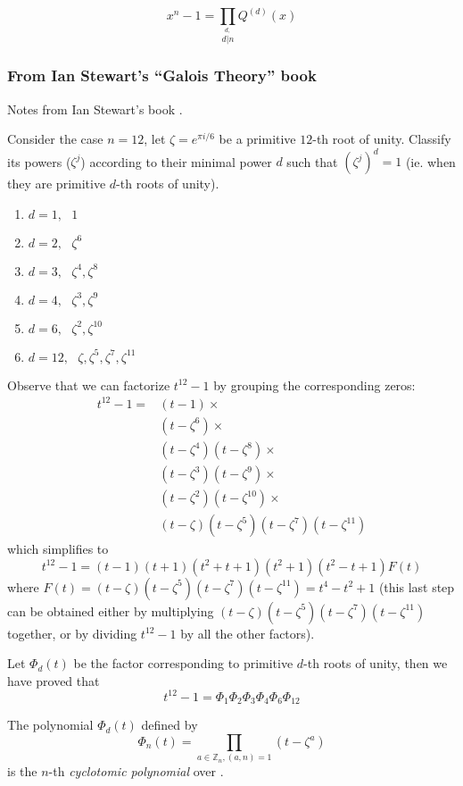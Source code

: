 \documentclass{article}
\theoremstyle{definition}
\newenvironment{defn}[1]
{\renewcommand\theinnerdefn{#1}\innerdefn}
{\endinnerdefn}
\newenvironment{thm}[1]
{\renewcommand\theinnerthm{#1}\innerthm}
{\endinnerthm}
\begin{document}
\begin{thm}{4.32}
  $$x^n -1 = \prod_{\stackrel{d,}{d|n}} Q^{(d)}(x)$$
\end{thm}


\subsubsection{From Ian Stewart's ``Galois Theory'' book}
Notes from Ian Stewart's book \cite{ianstewart}.

Consider the case $n=12$, let $\zeta=e^{\pi i /6}$ be a primitive $12$-th root of unity.
Classify its powers ($\zeta^j$) according to their minimal power $d$ such that
$(\zeta^j)^d = 1$ (ie. when they are primitive $d$-th roots of unity).

\begin{enumerate}[]
  \item $d=1,~~~ 1$
  \item $d=2,~~~ \zeta^6$
  \item $d=3,~~~ \zeta^4, \zeta^8$
  \item $d=4,~~~ \zeta^3, \zeta^9$
  \item $d=6,~~~ \zeta^2, \zeta^{10}$
  \item $d=12,~~~ \zeta, \zeta^5, \zeta^7, \zeta^{11}$
\end{enumerate}

Observe that we can factorize $t^{12} -1$ by grouping the corresponding zeros:
\begin{align*}
  t^{12}-1 = &(t-1) \times\\
	     &(t-\zeta^6) \times\\
	     &(t-\zeta^4) (t-\zeta^8) \times\\
	     &(t-\zeta^3) (t-\zeta^9) \times\\
	     &(t-\zeta^2) (t-\zeta^{10}) \times\\
	     &(t-\zeta) (t-\zeta^5)(t-\zeta^7) (t-\zeta^{11})
\end{align*}
which simplifies to
$$t^{12}-1=(t-1)(t+1)(t^2+t+1)(t^2+1)(t^2-t+1)F(t)$$
where $F(t) = (t-\zeta) (t-\zeta^5)(t-\zeta^7) (t-\zeta^{11}) = t^4 -t^2 + 1$ (this last step can be obtained either by multiplying $(t-\zeta)(t-\zeta^5)(t-\zeta^7) (t-\zeta^{11})$ together, or by dividing $t^{12}-1$ by all the other factors).


Let $\Phi_d(t)$ be the factor corresponding to primitive $d$-th roots of unity, then we have proved that
$$t^{12}-1 = \Phi_1 \Phi_2 \Phi_3 \Phi_4 \Phi_6 \Phi_{12}$$


\begin{defn}{21.5}
  The polynomial $\Phi_d(t)$ defined by
  $$\Phi_n(t) = \prod_{a\in \mathbb{Z}_n,(a,n)=1} (t- \zeta^a)$$
  is the $n$-th \emph{cyclotomic polynomial} over .
\end{defn}
\end{document}
